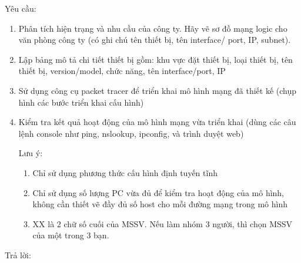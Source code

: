 Yêu cầu:
\begin{enumerate}
\bf \item Phân tích hiện trạng và nhu cầu của công ty. Hãy vẽ sơ đồ mạng logic cho văn phòng công ty (có ghi chú tên thiết bị, tên interface/ port, IP, subnet).

\rm 

\bf \item Lập bảng mô tả chi tiết thiết bị gồm: khu vực đặt thiết bị, loại thiết bị, tên thiết bị, version/model, chức năng, tên interface/port, IP

\rm

\bf \item Sử dụng công cụ packet tracer để triển khai mô hình mạng đã thiết kế (chụp hình các bước triển khai cấu hình)

\rm

\bf \item Kiểm tra kết quả hoạt động của mô hình mạng vừa triển khai (dùng các câu lệnh console như ping, nslookup, ipconfig, và trình duyệt web)

\rm Lưu ý:
\begin{enumerate}
\item Chỉ sử dụng phương thức cấu hình định tuyến tĩnh

\item Chỉ sử dụng số lượng PC vừa đủ để kiểm tra hoạt động của mô hình, không cần thiết vẽ đầy đủ số host cho mỗi đường mạng trong mô hình

\item XX là 2 chữ số cuối của MSSV. Nếu làm nhóm 3 người, thì chọn MSSV của một trong 3 bạn.
\end{enumerate}

\end{enumerate}

Trả lời:

